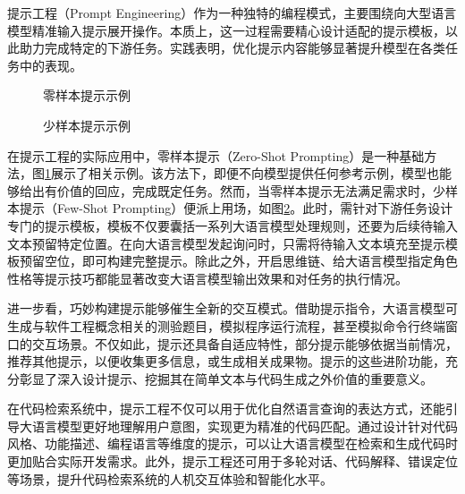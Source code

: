 \documentclass[UTF8,a4paper,12pt]{ctexart}
\numberwithin{equation}{section}
\begin{document}
提示工程（Prompt Engineering）作为一种独特的编程模式，主要围绕向大型语言模型精准输入提示展开操作。本质上，这一过程需要精心设计适配的提示模板，以此助力完成特定的下游任务。实践表明，优化提示内容能够显著提升模型在各类任务中的表现。\par

\begin{figure}[H]
	\caption{零样本提示示例}
	\label{zero_shot}
\end{figure}
\begin{figure}[H]
	\caption{少样本提示示例}
	\label{few_shot}
\end{figure}
在提示工程的实际应用中，零样本提示（Zero-Shot Prompting）是一种基础方法，图\ref{zero_shot}展示了相关示例。该方法下，即便不向模型提供任何参考示例，模型也能够给出有价值的回应，完成既定任务。然而，当零样本提示无法满足需求时，少样本提示（Few-Shot Prompting）便派上用场，如图\ref{few_shot}。此时，需针对下游任务设计专门的提示模板，模板不仅要囊括一系列大语言模型处理规则，还要为后续待输入文本预留特定位置。在向大语言模型发起询问时，只需将待输入文本填充至提示模板预留空位，即可构建完整提示。除此之外，开启思维链、给大语言模型指定角色性格等提示技巧都能显著改变大语言模型输出效果和对任务的执行情况。\par
进一步看，巧妙构建提示能够催生全新的交互模式。借助提示指令，大语言模型可生成与软件工程概念相关的测验题目，模拟程序运行流程，甚至模拟命令行终端窗口的交互场景。不仅如此，提示还具备自适应特性，部分提示能够依据当前情况，推荐其他提示，以便收集更多信息，或生成相关成果物。提示的这些进阶功能，充分彰显了深入设计提示、挖掘其在简单文本与代码生成之外价值的重要意义。\par
在代码检索系统中，提示工程不仅可以用于优化自然语言查询的表达方式，还能引导大语言模型更好地理解用户意图，实现更为精准的代码匹配。通过设计针对代码风格、功能描述、编程语言等维度的提示，可以让大语言模型在检索和生成代码时更加贴合实际开发需求。此外，提示工程还可用于多轮对话、代码解释、错误定位等场景，提升代码检索系统的人机交互体验和智能化水平。
\end{document}
